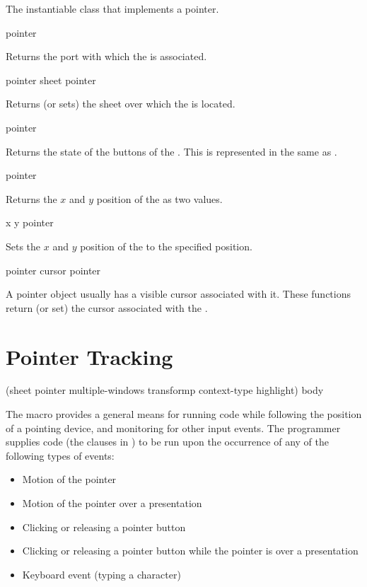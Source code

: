 The instantiable class that implements a pointer.

 {pointer}

Returns the port with which the   is associated.

 {pointer}
 {sheet pointer}

Returns (or sets) the sheet over which the   is located.

 {pointer}

Returns the state of the buttons of the  .  This is
represented in the same as .

 {pointer}

Returns the $x$ and $y$ position of the   as two
values.

 {x y pointer}

Sets the $x$ and $y$ position of the   to the
specified position.

 {pointer}
 {cursor pointer}

A pointer object usually has a visible cursor associated with it.  These
functions return (or set) the cursor associated with the 
.


\section {Pointer Tracking}

 {(sheet \key pointer multiple-windows
                                          transformp context-type highlight)
                              \body body}

The  macro provides a general means for running code while
following the position of a pointing device, and monitoring for other input
events.  The programmer supplies code (the clauses in ) to be run upon
the occurrence of any of the following types of events:

\begin{itemize}
\item Motion of the pointer

\item Motion of the pointer over a presentation

\item Clicking or releasing a pointer button

\item Clicking or releasing a pointer button while the pointer is over a presentation

\item Keyboard event (typing a character)
\end{itemize}

